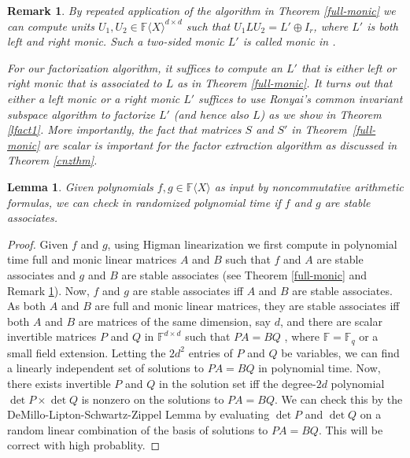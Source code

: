 \documentclass[10pt,a4paper]{article}
\newtheorem{lemma}[theorem]{Lemma}
\newtheorem{remark}[theorem]{Remark}
\newcommand{\F}{\mathbb{F}}
\renewcommand{\angle}[1]{\langle #1 \rangle}
\newcommand{\FX}{\F\angle{X}}
\newcommand{\fR}{\FX}
\begin{document}
\begin{remark}\label{remark-full-monic}
By repeated application of the algorithm in Theorem \ref{full-monic}
we can compute units $U_1,U_2\in\fR^{d\times d}$ such that $U_1 L U_2
= L' \oplus I_r$, where $L'$ is \emph{both left and right monic}. Such
a two-sided monic $L'$ is called \emph{monic} in \cite{Cohnfir}.

For our factorization algorithm, it suffices to compute an $L'$ that
is either left or right monic that is associated to $L$ as in Theorem
\ref{full-monic}. It turns out that either a left monic or a right
monic $L'$ suffices to use Ronyai's common invariant subspace
algorithm to factorize $L'$ (and hence also $L$) as we show in Theorem
\ref{lfact1}. More importantly, the fact that matrices $S$ and $S'$ in
Theorem~\ref{full-monic} are scalar is important for the factor
extraction algorithm as discussed in Theorem \ref{cnzthm}.
\end{remark}

\begin{lemma}\label{stable-algo}
  Given polynomials $f,g\in\fR$ as input by noncommutative arithmetic
  formulas, we can check in randomized polynomial time if $f$ and $g$
  are stable associates.
\end{lemma}

\begin{proof}
  Given $f$ and $g$, using Higman linearization we first compute in
  polynomial time full and monic linear matrices $A$ and $B$ such that
  $f$ and $A$ are stable associates and $g$ and $B$ are stable
  associates (see Theorem \ref{full-monic} and Remark
  \ref{remark-full-monic}). Now, $f$ and $g$ are stable associates iff
  $A$ and $B$ are stable associates. As both $A$ and $B$ are full and
  monic linear matrices, they are stable associates iff both $A$ and
  $B$ are matrices of the same dimension, say $d$, and there are
  scalar invertible matrices $P$ and $Q$ in $\F^{d\times d}$ such that
  $PA=BQ$ \cite[Theorem 5.8.3]{Cohnfir}, where $\F=\F_q$ or a small field extension. Letting the
  $2d^2$ entries of $P$ and $Q$ be variables, we can find a linearly
  independent set of solutions to $PA=BQ$ in polynomial time. Now,
  there exists invertible $P$ and $Q$ in the solution set iff the
  degree-$2d$ polynomial $\det P \times \det Q$ is nonzero on the
  solutions to $PA=BQ$. We can check this by the
  DeMillo-Lipton-Schwartz-Zippel Lemma \cite{DL78,Sch80,Zip79} by
  evaluating $\det P$ and $\det Q$ on a random linear combination of
  the basis of solutions to $PA=BQ$. This will be correct with high
  probablity.
\end{proof}
\end{document}
